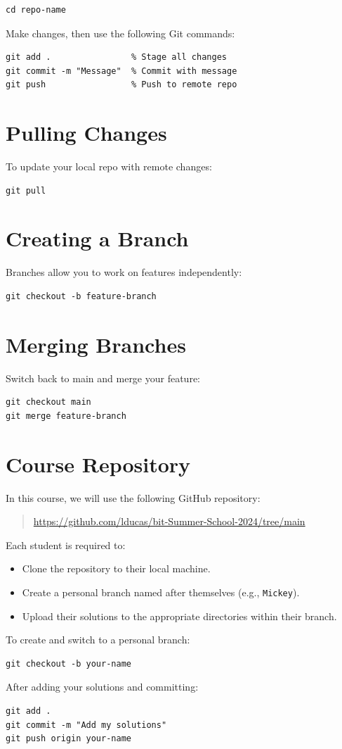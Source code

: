 \documentclass[11pt]{article}
\begin{document}
\begin{lstlisting}
cd repo-name
\end{lstlisting}

\noindent Make changes, then use the following Git commands:

\begin{lstlisting}
git add .                % Stage all changes
git commit -m "Message"  % Commit with message
git push                 % Push to remote repo
\end{lstlisting}

\section{Pulling Changes}
To update your local repo with remote changes:

\begin{lstlisting}
git pull
\end{lstlisting}

\section{Creating a Branch}
Branches allow you to work on features independently:

\begin{lstlisting}
git checkout -b feature-branch
\end{lstlisting}

\section{Merging Branches}
Switch back to main and merge your feature:

\begin{lstlisting}
git checkout main
git merge feature-branch
\end{lstlisting}

\section{Course Repository}
In this course, we will use the following GitHub repository:

\begin{quote}
\url{https://github.com/lducas/bit-Summer-School-2024/tree/main}
\end{quote}

\noindent Each student is required to:

\begin{itemize}
    \item Clone the repository to their local machine.
    \item Create a personal branch named after themselves (e.g., \texttt{Mickey}).
    \item Upload their solutions to the appropriate directories within their branch.
\end{itemize}

\noindent To create and switch to a personal branch:

\begin{lstlisting}
git checkout -b your-name
\end{lstlisting}

\noindent After adding your solutions and committing:

\begin{lstlisting}
git add .
git commit -m "Add my solutions"
git push origin your-name
\end{lstlisting}
\end{document}

